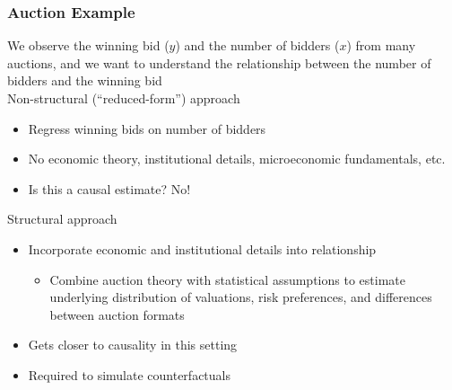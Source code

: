 \documentclass{beamer}\usepackage[]{graphicx}\usepackage[]{color}
\begin{document}
\begin{frame}\frametitle{Auction Example}
    We observe the winning bid ($y$) and the number of bidders ($x$) from many auctions, and we want to understand the relationship between the number of bidders and the winning bid \\
    \vspace{1.5ex}
    Non-structural (``reduced-form'') approach
    \begin{itemize}
        \item Regress winning bids on number of bidders
        \item No economic theory, institutional details, microeconomic fundamentals, etc.
        \item Is this a causal estimate? No!
    \end{itemize}
    \vspace{1.5ex}
    Structural approach
    \begin{itemize}
        \item Incorporate economic and institutional details into relationship
        \begin{itemize}
            \item Combine auction theory with statistical assumptions to estimate underlying distribution of valuations, risk preferences, and differences between auction formats
        \end{itemize}
        \item Gets closer to causality in this setting
        \item Required to simulate counterfactuals
    \end{itemize}
\end{frame}
\end{document}
